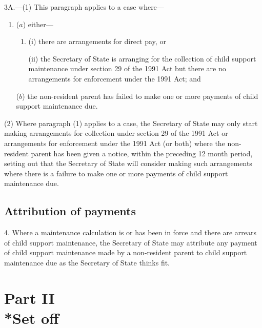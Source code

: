 \documentclass[12pt,a4paper]{article}
\begin{document}
3A.—(1) This paragraph applies to a case where—
\begin{enumerate}\item[]
($a$) either—
\begin{enumerate}\item[]
(i) there are arrangements for direct pay, or

(ii) the Secretary of State is arranging for the collection of child support maintenance under section 29 of the 1991 Act but there are no arrangements for enforcement under the 1991 Act; and
\end{enumerate}

($b$) the non-resident parent has failed to make one or more payments of child support maintenance due.
\end{enumerate}

(2) Where paragraph (1) applies to a case, the Secretary of State may only start making arrangements for collection under section 29 of the 1991 Act or arrangements for enforcement under the 1991 Act (or both) where the non-resident parent has been given a notice, within the preceding 12 month period, setting out that the Secretary of State will consider making such arrangements where there is a failure to make one or more payments of child support maintenance due.


\subsection[4. Attribution of payments]{Attribution of payments}

4.  Where a maintenance calculation is or has been in force and there are arrears of child support maintenance, the 
Secretary of State  %
may attribute any payment of child support maintenance made by a non-resident parent to child support maintenance due as 
the Secretary of State  %
thinks fit.


\section[Part II --- Set off]{Part II\\*Set off}
\end{document}

